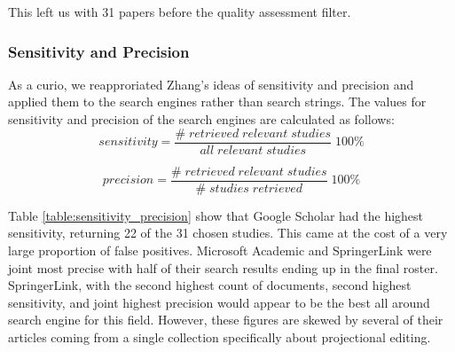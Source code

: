 This left us with 31 papers before the quality assessment filter.

\subsubsection{Sensitivity and Precision}
As a curio, we reapproriated Zhang's\cite{Zhang_2011} ideas of sensitivity and precision and applied them to the search engines rather than search strings.
The values for sensitivity and precision of the search engines are calculated as follows:
\[
        sensitivity = \frac{\#\;retrieved\;relevant\;studies}{all\;relevant\;studies} \;100\%
\]

\[
        precision = \frac{\#\;retrieved\;relevant\;studies}{\#\;studies\;retrieved} \;100\%
\]

Table \ref{table:sensitivity_precision} show that Google Scholar had the highest sensitivity, returning 22 of the 31 chosen studies.
This came at the cost of a very large proportion of false positives.
Microsoft Academic and SpringerLink were joint most precise with half of their search results ending up in the final roster.
SpringerLink, with the second highest count of documents, second highest sensitivity, and joint highest precision would appear to be the best all around search engine for this field.
However, these figures are skewed by several of their articles coming from a single collection specifically about projectional editing.

